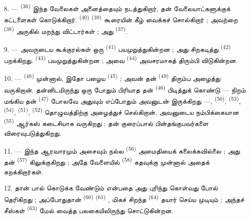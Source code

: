\VUsaut{3.0mm}
\VUsaut{3.0mm}

8. ---  \textsuperscript{(36)} இந்த வேலைகள்
அனைத்தையும் நடத்துகிறார், தன் வேலையாட்களுக்குக் கட்டளைகள்
கொடுக்கிறார்.  \textsuperscript{(40)}
 \textsuperscript{(39)} கூரையின் கீழ் வைக்கச்
சொல்கிறார் ; அவற்றை  \textsuperscript{(38)} அருகில்
மறந்து விட்டார்கள் ; அது  \textsuperscript{(37)}.

9. --- அவருடைய கூக்குரல்கள் ஒரு  \textsuperscript{(41)}
பயமுறுத்துகின்றன ; அது சிறகடித்து 
\textsuperscript{(42)} பறக்கிறது. 
\textsuperscript{(43)} பயமுறுத்துகின்றன ; அவை 
\textsuperscript{(44)} அவசரமாகத் திரும்பி விடுகின்றன.

10. ---  \textsuperscript{(48)} முன்னால்,
இதோ பழைய  \textsuperscript{(45)} ; அவன் தன்
 \textsuperscript{(49)} திரும்ப அழைத்து வருகிறான்.
தன்னிடமிருந்து ஒரு போதும் பிரியாத தன் 
\textsuperscript{(46)} பிடித்துக் கொண்டு — நிறம் மங்கிய தன்
 \textsuperscript{(47)} போலவே அதுவும் எப்போதும்
அவனுடன் இருக்கிறது —, 
\textsuperscript{(50)},  \textsuperscript{(53)},
 \textsuperscript{(54)},
 \textsuperscript{(51)},  \textsuperscript{(52)} தொழுவத்திற்கு அழைத்துச்
செல்கிறான். அவனுடைய நம்பிக்கையான  \textsuperscript{(55)}
ஆர்கஸ் கடைசியாக வருகிறது ; தன் குரைப்பால் பின்தங்குபவர்களை
விரைவுபடுத்துகிறது.

11. --- இந்த ஆரவாரமும் அசைவும் நல்ல 
\textsuperscript{(56)} அமைதியைக் கலைக்கவில்லை ; அது தன்
 \textsuperscript{(57)} கிலுக்குகிறது ; அதே வேளையில்
 \textsuperscript{(58)} கதவுக்கு முன்னால் அதைக்
கறக்கிறார்கள்.

12. தான் பால் கொடுக்க வேண்டும் என்பதை அது புரிந்து கொள்வது போல்
தெரிகிறது ; அப்போதுதான்  \textsuperscript{(60)}
 \textsuperscript{(61)} ,
மிகச் சிறந்த  \textsuperscript{(64)} தயார் செய்ய
முடியும் ; அந்தச் சீஸ்கள் 
\textsuperscript{(63)} மேல் வைத்த பலகையிலிருந்து சொட்டுகின்றன.

